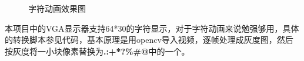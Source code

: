 \documentclass[]{article}
\begin{document}
  \begin{figure}[H]
    \centering
    \caption{字符动画效果图}
    \label{fig:twopicture} 
  \end{figure}

  本项目中的VGA显示器支持64*30的字符显示，对于字符动画来说勉强够用，具体的转换脚本参见代码，基本原理是用opencv导入视频，逐帧处理成灰度图，然后按灰度将一小块像素替换为\textbf{.:+*?\%\#@}中的一个。
\end{document}

